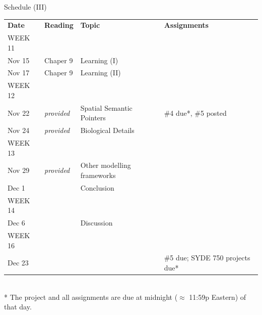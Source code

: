 \documentclass[aspectratio=169]{beamer}
\begin{document}
\begin{frame}{Schedule (III)}
	\small
	\begin{tabular}{p{2cm} p{2cm} p{5cm} p{3cm}}
		\toprule
		\textbf{Date} &	\textbf{Reading} &	\textbf{Topic} & \textbf{Assignments} \\
		\tiny WEEK 11 & & & \\
		Nov 15 &
		Chaper 9 &
		Learning (I) &
		\\
		Nov 17 &
		Chaper 9 &
		Learning (II) &
		\\[0.05cm]
		\tiny WEEK 12 & & & \\
		Nov 22 &
		\emph{provided} &
		Spatial Semantic Pointers &
		\#4 due*, \#5 posted\\
		Nov 24 &
		\emph{provided} &
		Biological Details &
		\\[0.05cm]
		
		\tiny WEEK 13 & & & \\
		Nov 29 &
		\emph{provided} &
		Other modelling frameworks &
		\\
		Dec 1 &
		&
		Conclusion &
		\\[0.05cm]
		
		\tiny WEEK 14 & & & \\
		Dec 6 &
		&
		Discussion &
		\\[0.05cm]
		
		\tiny WEEK 16 & & & \\
		Dec 23 &
		&
		&
		\#5 due; SYDE 750 projects due* \\
		\bottomrule
	\end{tabular}\\[0.2cm]
	\footnotesize
	* The project and all assignments are due at midnight ($\approx$ 11:59p Eastern) of that day.
\end{frame}
\end{document}
